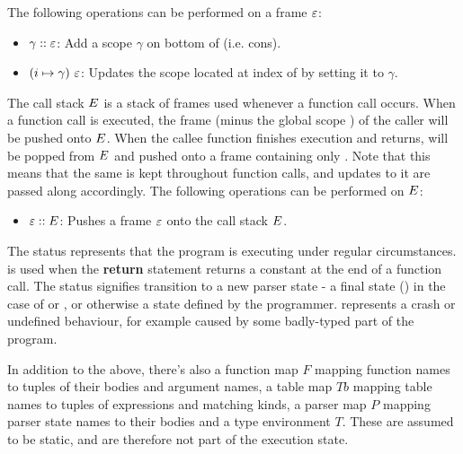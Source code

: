 \documentclass[UTF8]{article}
\begin{document}
The following operations can be performed on a frame $\varepsilon$:
\begin{itemize}
\item $ \gamma :: \varepsilon$: Add a scope $\gamma$ on bottom of \currsf{} (i.e. cons).
\item $(i \mapsto  \gamma) \,\, \varepsilon$: Updates the scope located at index \num{} of \currsf{} by setting it to $\gamma$.
\end{itemize}

The call stack $E$ is a stack of frames used whenever a function call occurs. When a function call is executed, the frame \currsf{} (minus the global scope \gscope{}) of the caller will be pushed onto $E$. When the callee function finishes execution and returns, \currsf{} will be popped from $E$ and pushed onto a frame containing only \gscope{}. Note that this means that the same \gscope{} is kept throughout function calls, and updates to it are passed along accordingly. The following operations can be performed on $E$: 
\begin{itemize}
\item $ \varepsilon :: E$: Pushes a frame $\varepsilon$ onto the call stack $E$.
\end{itemize}

The status \running{} represents that the program is executing under regular circumstances.  is used when the \textbf{return} statement returns a constant \cval{} at the end of a function call. The status \trans{\vn{}} signifies transition to a new parser state - a final state (\pfin{}) in the case of \accept{} or \reject{}, or otherwise a state defined by the programmer. \sterr{} represents a crash or undefined behaviour, for example caused by some badly-typed part of the program. 

In addition to the above, there's also a function map $F$ mapping function names to tuples of their bodies and argument names, a table map $\mathit{Tb}$ mapping table names to tuples of expressions and matching kinds, a parser map $P$ mapping parser state names to their bodies and a type environment $T$. These are assumed to be static, and are therefore not part of the execution state.




\newpage
\end{document}
